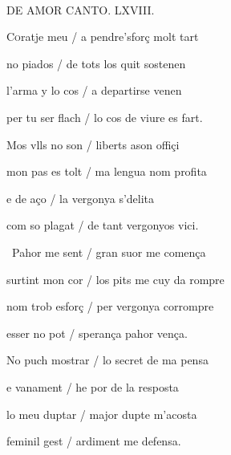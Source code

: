 \documentclass[12pt]{article}
\renewcommand{\espaiAbansEtiquetaPoema}{\vspace{0ex}}
\begin{document}
\begin{estrofa}

\espaiAbansEtiquetaPoema

\\

\begin{rubrica}

\pagina{[83r]} DE AMOR CANTO. LXVIII.

\end{rubrica}

\end{estrofa}


\begin{estrofa}

 C\textsc{o}ratje meu / a pendre'sfor\c{c} molt tart

 no piados / de tots los quit sostenen

 l'arma y lo cos / a departirse venen

 per tu ser flach / lo cos de viure es fart.

 Mos vlls no son / liberts ason offi\c{c}i

 mon pas es tolt / ma lengua nom profita

 e de a\c{c}o / la vergonya s'delita

 com so plagat / de tant vergonyos vici.

\end{estrofa}



\begin{estrofa}

 \textparagraph\  Pahor me sent / gran suor me comen\c{c}a

 surtint mon cor / los pits me cuy da rompre

 nom trob esfor\c{c} / per vergonya corrompre

 esser no pot / speran\c{c}a pahor ven\c{c}a.

 No puch mostrar / lo secret de ma pensa

 e vanament / he por de la resposta

 lo meu duptar / major dupte m'acosta

 feminil gest / ardiment me defensa.

\end{estrofa}
\end{document}

